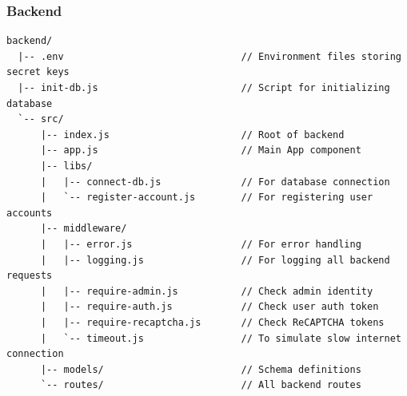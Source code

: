 \subsubsection{Backend}
\begin{verbatim}
backend/
  |-- .env                               // Environment files storing secret keys
  |-- init-db.js                         // Script for initializing database
  `-- src/
      |-- index.js                       // Root of backend
      |-- app.js                         // Main App component
      |-- libs/
      |   |-- connect-db.js              // For database connection
      |   `-- register-account.js        // For registering user accounts
      |-- middleware/
      |   |-- error.js                   // For error handling
      |   |-- logging.js                 // For logging all backend requests
      |   |-- require-admin.js           // Check admin identity
      |   |-- require-auth.js            // Check user auth token
      |   |-- require-recaptcha.js       // Check ReCAPTCHA tokens
      |   `-- timeout.js                 // To simulate slow internet connection
      |-- models/                        // Schema definitions
      `-- routes/                        // All backend routes
\end{verbatim}